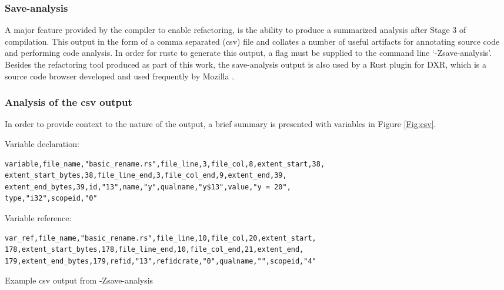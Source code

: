 \subsubsection{Save-analysis}
A major feature provided by the compiler to enable refactoring, is the ability to produce a summarized analysis after Stage 3 of compilation. This output in the form of a comma separated (csv) file and collates a number of useful artifacts for annotating source code and performing code analysis. In order for rustc to generate this output, a flag must be supplied to the command line `-Zsave-analysis'. Besides the refactoring tool produced as part of this work, the save-analysis output is also used by a Rust plugin for DXR, which is a source code browser developed and used frequently by Mozilla \cite{dxr15}.  


\subsubsection{Analysis of the csv output}
In order to provide context to the nature of the output, a brief summary is presented with variables in Figure \ref{Fig:csv}.

\begin{fig}
\vspace{5mm}
\noindent
Variable declaration:
\begin{verbatim}
variable,file_name,"basic_rename.rs",file_line,3,file_col,8,extent_start,38,
extent_start_bytes,38,file_line_end,3,file_col_end,9,extent_end,39,
extent_end_bytes,39,id,"13",name,"y",qualname,"y$13",value,"y = 20",
type,"i32",scopeid,"0"
\end{verbatim}

\noindent
Variable reference:
\begin{verbatim}
var_ref,file_name,"basic_rename.rs",file_line,10,file_col,20,extent_start,
178,extent_start_bytes,178,file_line_end,10,file_col_end,21,extent_end,
179,extent_end_bytes,179,refid,"13",refidcrate,"0",qualname,"",scopeid,"4"
\end{verbatim}

\caption{Example csv output from -Zsave-analysis}
\label{Fig:csv}
\end{fig}

